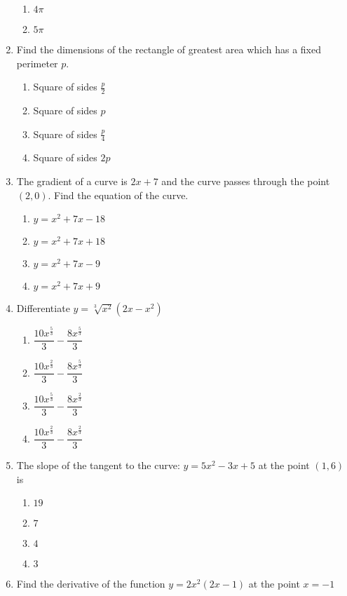 \begin{multicols}{2}
\begin{enumerate}[label={\arabic*.}]
\begin{enumerate}[label={\Alph*.}]
\item \(4\pi\)
\item \(5\pi\)
\end{enumerate}
\item Find the dimensions of the rectangle of greatest area which has a fixed perimeter \(p\).
\begin{enumerate}[label={\Alph*.}]
\item Square of sides \(\frac{p}{2}\)
\item Square of sides \(p\)
\item Square of sides \(\frac{p}{4}\)
\item Square of sides \(2p\)
\end{enumerate}
\item The gradient of a curve is \(2x+7\) and the curve passes through the point \((2, 0)\). Find the equation of the curve.
\begin{enumerate}[label={\Alph*.}]
\item \(y = {x}^{2}+7x-18\)
\item \(y = {x}^{2}+7x+18\)
\item \(y = {x}^{2}+7x-9\)
\item \(y = {x}^{2}+7x+9\)
\end{enumerate}
\item Differentiate \(y = \sqrt[3]{{x}^{2}}(2x-{x}^{2})\)
\begin{enumerate}[label={\Alph*.}]
\item \(\dfrac{10{x}^{\frac{5}{3}}}{3} -\dfrac{8{x}^{\frac{5}{3}}}{3}\)
\item \(\dfrac{10{x}^{\frac{2}{3}}}{3} -\dfrac{8{x}^{\frac{5}{3}}}{3}\)
\item \(\dfrac{10{x}^{\frac{5}{3}}}{3} -\dfrac{8{x}^{\frac{2}{3}}}{3}\)
\item \(\dfrac{10{x}^{\frac{2}{3}}}{3} -\dfrac{8{x}^{\frac{2}{3}}}{3}\)
\end{enumerate}
\item The slope of the tangent to the curve: \(y=5{x}^{2}-3x+5\) at the point \((1,6)\) is
\begin{enumerate}[label={\Alph*.}]
\item \(19\)
\item \(7\)
\item \(4\)
\item \(3\)
\end{enumerate}
\item Find the derivative of the function \(y=2{x}^{2}(2x-1)\) at the point \(x = -1\)
\begin{enumerate}[label={\Alph*.}]

\end{enumerate}
\end{enumerate}
\end{multicols}
